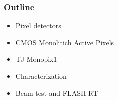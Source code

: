 \documentclass{beamer}
\begin{document}
\begin{frame}[noframenumbering]
    \frametitle{Outline}
    \begin{itemize}
        \item Pixel detectors 
        \item CMOS Monolitich Active Pixels 
        \item TJ-Monopix1
        \item Characterization 
        \item <alert@1> Beam test and FLASH-RT
    \end{itemize}
\end{frame}






        
\end{document}
